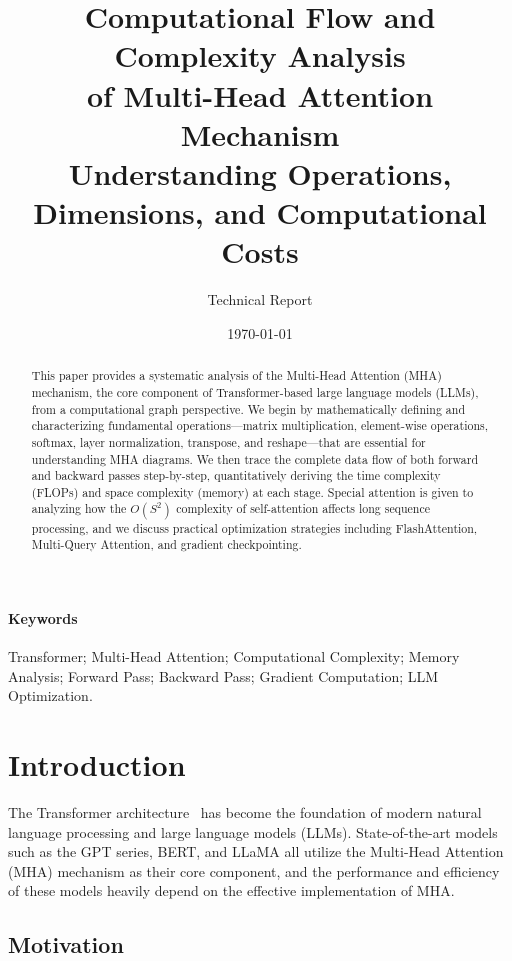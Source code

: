 \documentclass[10pt]{article}
\title{Computational Flow and Complexity Analysis\\of Multi-Head Attention Mechanism\\\large Understanding Operations, Dimensions, and Computational Costs}
\author{Technical Report}
\date{\today}
\begin{document}
\maketitle

\begin{abstract}
This paper provides a systematic analysis of the Multi-Head Attention (MHA) mechanism, the core component of Transformer-based large language models (LLMs), from a computational graph perspective. We begin by mathematically defining and characterizing fundamental operations—matrix multiplication, element-wise operations, softmax, layer normalization, transpose, and reshape—that are essential for understanding MHA diagrams. We then trace the complete data flow of both forward and backward passes step-by-step, quantitatively deriving the time complexity (FLOPs) and space complexity (memory) at each stage. Special attention is given to analyzing how the $O(S^2)$ complexity of self-attention affects long sequence processing, and we discuss practical optimization strategies including FlashAttention, Multi-Query Attention, and gradient checkpointing.
\end{abstract}

\paragraph{Keywords} Transformer; Multi-Head Attention; Computational Complexity; Memory Analysis; Forward Pass; Backward Pass; Gradient Computation; LLM Optimization.

\tableofcontents
\newpage

\section{Introduction}
\label{sec:intro}

The Transformer architecture~\cite{vaswani2017attention} has become the foundation of modern natural language processing and large language models (LLMs). State-of-the-art models such as the GPT series, BERT, and LLaMA all utilize the Multi-Head Attention (MHA) mechanism as their core component, and the performance and efficiency of these models heavily depend on the effective implementation of MHA.

\subsection{Motivation}
\end{document}
